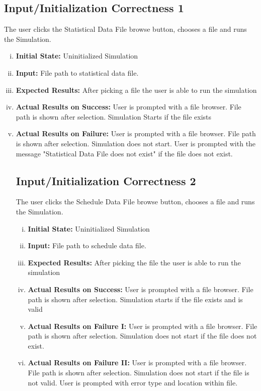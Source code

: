 \documentclass[paper=letter, fontsize=10pt]{scrartcl}
\numberwithin{equation}{section}		%
\numberwithin{figure}{section}			%
\numberwithin{table}{section}				%
\begin{document}
\subsection{Input/Initialization Correctness 1}
The user clicks the Statistical Data File browse button, chooses a file and runs the Simulation. 
\begin{enumerate}[(i)]
	\item \textbf{Initial State:} Uninitialized Simulation   
	\item \textbf{Input:} File path to statistical data file.
	\item \textbf{Expected Results:} After picking a file the user is able to run the simulation 
	\item \textbf{Actual Results on Success:} User is prompted with a file browser. File path is shown after selection. Simulation Starts if the file exists
	\item \textbf{Actual Results on Failure:} User is prompted with a file browser. File path is shown after selection. Simulation does not start. User is prompted with the message "Statistical Data File does not exist" if the file does not exist.
	
\subsection{Input/Initialization Correctness 2}
The user clicks the Schedule Data File browse button, chooses a file and runs the Simulation.
\begin{enumerate}[(i)]
	\item \textbf{Initial State:} Uninitialized Simulation   
	\item \textbf{Input:} File path to schedule data file.
	\item \textbf{Expected Results:} After picking the file the user is able to run the simulation
	\item \textbf{Actual Results on Success:} User is prompted with a file browser. File path is shown after selection. Simulation starts if the file exists and is valid
	\item \textbf{Actual Results on Failure I:} User is prompted with a file browser. File path is shown after selection. Simulation does not start if the file does not exist.
	\item \textbf{Actual Results on Failure II:} User is prompted with a file browser. File path is shown after selection. Simulation does not start if the file is not valid. User is prompted with error type and location within file.


\end{enumerate}
\end{enumerate}
\end{document}
